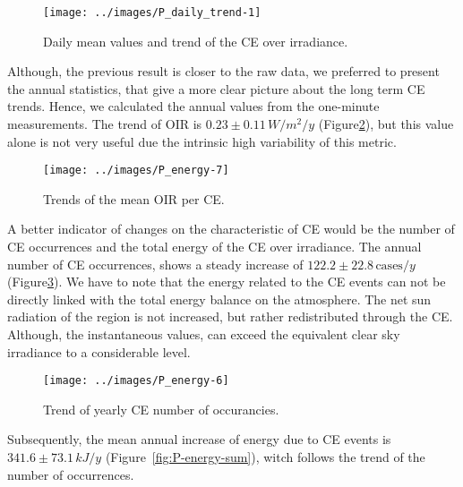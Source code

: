\documentclass[
  preprint, 3p, authoryear]{article}
\begin{document}
\begin{figure}

{\centering \texttt{[image: ../images/P\_daily\_trend-1]} 

}

\caption{Daily mean values and trend of the CE over irradiance.}\label{fig:CEmeanDaily}
\end{figure}

Although, the previous result is closer to the raw data, we preferred to present the
annual statistics, that give a more clear picture about the long term CE trends.
Hence, we calculated the annual values from the one-minute measurements. The trend of
OIR is
\(0.23\pm 0.11\,W/m^2/y\)
(Figure\nobreakspace{}\ref{fig:P-energy-mean}),
but this value alone is not very useful due the intrinsic high variability of this
metric.

\begin{figure}

{\centering \texttt{[image: ../images/P\_energy-7]} 

}

\caption{Trends of the mean OIR per CE.}\label{fig:P-energy-mean}
\end{figure}

A better indicator of changes on the characteristic of CE would be the number of CE
occurrences and the total energy of the CE over irradiance. The annual number of CE
occurrences, shows a steady increase of
\(122.2\pm 22.8\,\text{cases}/y\)
(Figure\nobreakspace{}\ref{fig:P-energy-N}).
We have to note that the energy related to the CE events can not be directly linked
with the total energy balance on the atmosphere. The net sun radiation of the region
is not increased, but rather redistributed through the CE. Although, the
instantaneous values, can exceed the equivalent clear sky irradiance to a
considerable level.

\begin{figure}

{\centering \texttt{[image: ../images/P\_energy-6]} 

}

\caption{Trend of yearly CE number of occurancies.}\label{fig:P-energy-N}
\end{figure}

Subsequently, the mean annual increase of energy due to CE events is
\(341.6\pm 73.1\,kJ/y\)
(Figure~\ref{fig:P-energy-sum}), witch follows the trend of the number of
occurrences.
\end{document}
